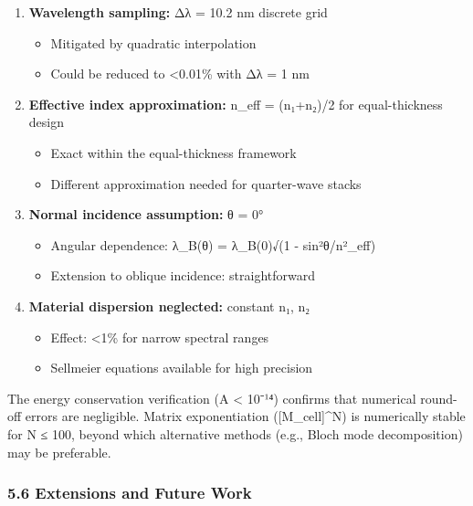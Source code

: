 \documentclass[
]{article}
\providecommand{\tightlist}{%
  \setlength{\itemsep}{0pt}\setlength{\parskip}{0pt}}
\begin{document}
\begin{enumerate}
\def\labelenumi{\arabic{enumi}.}
\tightlist
\item
  \textbf{Wavelength sampling:} Δλ = 10.2 nm discrete grid

  \begin{itemize}
  \tightlist
  \item
    Mitigated by quadratic interpolation
  \item
    Could be reduced to \textless0.01\% with Δλ = 1 nm
  \end{itemize}
\item
  \textbf{Effective index approximation:} n\_eff = (n₁+n₂)/2 for
  equal-thickness design

  \begin{itemize}
  \tightlist
  \item
    Exact within the equal-thickness framework
  \item
    Different approximation needed for quarter-wave stacks
  \end{itemize}
\item
  \textbf{Normal incidence assumption:} θ = 0°

  \begin{itemize}
  \tightlist
  \item
    Angular dependence: λ\_B(θ) = λ\_B(0)√(1 - sin²θ/n²\_eff)
  \item
    Extension to oblique incidence: straightforward
  \end{itemize}
\item
  \textbf{Material dispersion neglected:} constant n₁, n₂

  \begin{itemize}
  \tightlist
  \item
    Effect: \textless1\% for narrow spectral ranges
  \item
    Sellmeier equations available for high precision
  \end{itemize}
\end{enumerate}

The energy conservation verification (\textbar A\textbar{} \textless{}
10⁻¹⁴) confirms that numerical round-off errors are negligible. Matrix
exponentiation ({[}M\_cell{]}\^{}N) is numerically stable for N ≤ 100,
beyond which alternative methods (e.g., Bloch mode decomposition) may be
preferable.

\subsubsection{5.6 Extensions and Future
Work}\label{extensions-and-future-work}
\end{document}
